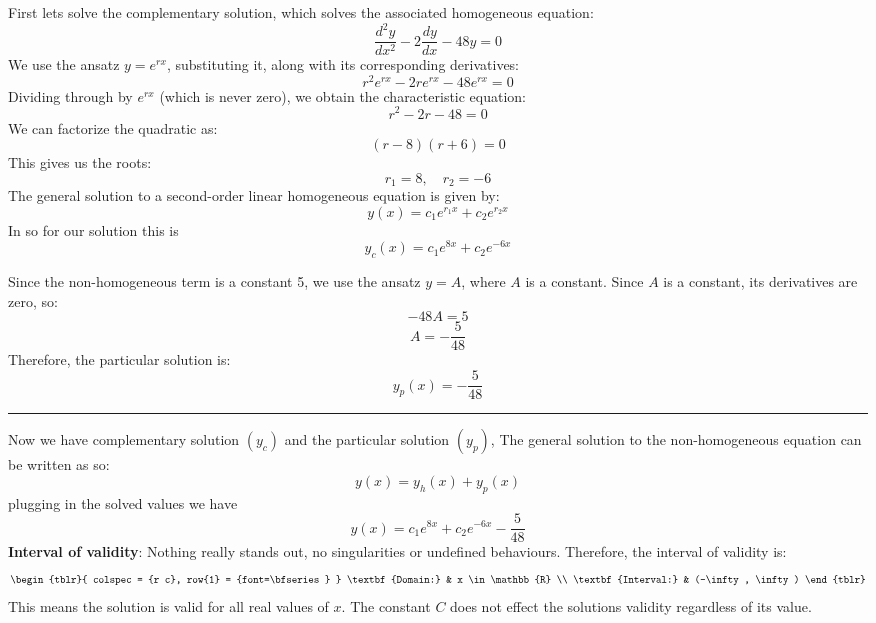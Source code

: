 \documentclass[a4paper, 12pt]{report}
\begin{document}
    \begin{minipage}[t]{0.5\textwidth}
            First lets solve the complementary solution, which solves the associated homogeneous equation:
            \[ \frac{d^2 y}{dx^2} - 2 \frac{dy}{dx} - 48y = 0 \]
            We use the ansatz \( y = e^{rx} \), substituting it, along with its corresponding derivatives:
            \[ r^2 e^{rx} - 2r e^{rx} - 48 e^{rx} = 0 \]
            Dividing through by \( e^{rx} \) (which is never zero), we obtain the characteristic equation:
            \[ r^2 - 2r - 48 = 0 \]
            We can factorize the quadratic as:
            \[(r - 8)(r + 6)=0\]
            This gives us the roots:
            \[ r_1 = 8, \quad r_2 = -6 \]
            The general solution to a second-order linear homogeneous equation is given by:
            \[ y(x) = c_1 e^{r_1x} + c_2 e^{r_2x} \]
            In so for our solution this is
            \[ y_c(x) = c_1 e^{8x} + c_2 e^{-6x} \]
    \end{minipage}\hfil%
    \begin{minipage}[t]{0.45\textwidth}
        Since the non-homogeneous term is a constant 5, we use the ansatz \(y=A\), where \(A\) is a constant. Since \(A\) is a constant, its derivatives are zero, so:
        \[-48A = 5\]
        \[A=-\frac{5}{48} \]
        Therefore, the particular solution is:
        \[ y_p(x) = -\frac{5}{48} \]

        \hrule
        \vspace{1em}
        
        Now we have complementary solution \((y_c)\) and the particular solution \((y_p)\), The general solution to the non-homogeneous equation can be written as so:
        \[ y(x) = y_h(x) + y_p(x) \]
        plugging in the solved values we have
        \[\boxed{y(x) = c_1 e^{8x} + c_2 e^{-6x} - \frac{5}{48}} \]    
        \textbf{Interval of validity}: Nothing really stands out, no singularities or undefined behaviours. Therefore, the interval of validity is:
        \[
        \begin{tblr}{
                colspec = {r c},
                row{1} = {font=\bfseries}
            }
            \textbf{Domain:} & x \in \mathbb{R} \\
            \textbf{Interval:} & (-\infty, \infty)
        \end{tblr}
        \]
        This means the solution is valid for all real values of \(x\). The constant \(C\) does not effect the solutions validity regardless of its value.
    \end{minipage}        
    
\end{document}
